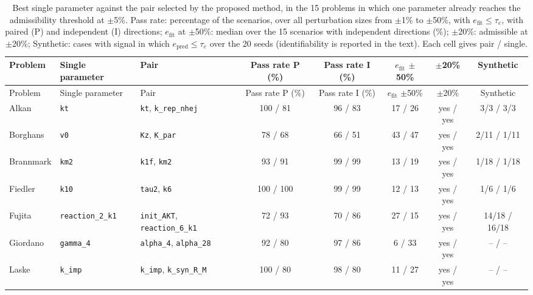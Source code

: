 \begin{longtable}{@{}>{\raggedright\arraybackslash}p{1.7cm}>{\raggedright\arraybackslash}p{2.6cm}>{\raggedright\arraybackslash}p{3.0cm}ccccc@{}}
\caption{Best single parameter against the pair selected by the proposed method, in the 15 problems in which one parameter already reaches the admissibility threshold at $\pm$5\%. Pass rate: percentage of the scenarios, over all perturbation sizes from $\pm$1\% to $\pm$50\%, with $e_{\mathrm{fit}}\le\tau_e$, with paired (P) and independent (I) directions; $e_{\mathrm{fit}}$ at $\pm$50\%: median over the 15 scenarios with independent directions (\%); $\pm$20\%: admissible at $\pm$20\%; Synthetic: cases with signal in which $e_{\mathrm{pred}}\le\tau_e$ over the 20 seeds (identifiability is reported in the text). Each cell gives pair / single.}\label{tab:kmin}\\
\toprule
Problem & Single parameter & Pair & Pass rate P (\%) & Pass rate I (\%) & $e_{\mathrm{fit}}$ $\pm$50\% & $\pm$20\% & Synthetic \\
\midrule
\endfirsthead
\toprule
Problem & Single parameter & Pair & Pass rate P (\%) & Pass rate I (\%) & $e_{\mathrm{fit}}$ $\pm$50\% & $\pm$20\% & Synthetic \\
\midrule
\endhead
Alkan & \texttt{kt} & \texttt{kt}, \texttt{k\_\allowbreak{}rep\_\allowbreak{}nhej} & 100 / 81 & 96 / 83 & 17 / 26 & yes / yes & 3/3 / 3/3 \\
Borghans & \texttt{v0} & \texttt{Kz}, \texttt{K\_\allowbreak{}par} & 78 / 68 & 66 / 51 & 43 / 47 & yes / yes & 2/11 / 1/11 \\
Brannmark & \texttt{km2} & \texttt{k1f}, \texttt{km2} & 93 / 91 & 99 / 99 & 13 / 19 & yes / yes & 1/18 / 1/18 \\
Fiedler & \texttt{k10} & \texttt{tau2}, \texttt{k6} & 100 / 100 & 99 / 99 & 12 / 13 & yes / yes & 1/6 / 1/6 \\
Fujita & \texttt{reaction\_\allowbreak{}2\_\allowbreak{}k1} & \texttt{init\_\allowbreak{}AKT}, \texttt{reaction\_\allowbreak{}6\_\allowbreak{}k1} & 72 / 93 & 70 / 86 & 27 / 15 & yes / yes & 14/18 / 16/18 \\
Giordano & \texttt{gamma\_\allowbreak{}4} & \texttt{alpha\_\allowbreak{}4}, \texttt{alpha\_\allowbreak{}28} & 92 / 80 & 97 / 86 & 6 / 33 & yes / yes & -- / -- \\
Laske & \texttt{k\_\allowbreak{}imp} & \texttt{k\_\allowbreak{}imp}, \texttt{k\_\allowbreak{}syn\_\allowbreak{}R\_\allowbreak{}M} & 100 / 80 & 98 / 80 & 11 / 27 & yes / yes & -- / -- \\

\end{longtable}
